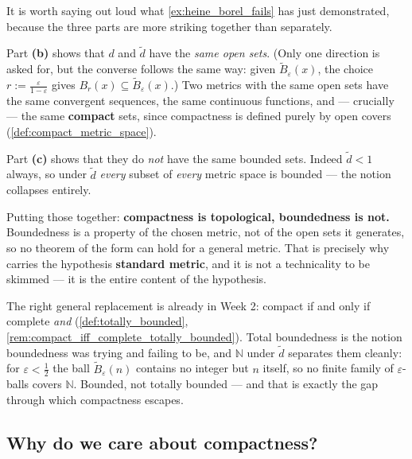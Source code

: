 \begin{remark}
\label{rem:boundedness_not_topological}
It is worth saying out loud what \cref{ex:heine_borel_fails} has just demonstrated, because the
three parts are more striking together than separately.

Part \textbf{(b)} shows that $d$ and $\tilde d$ have the \emph{same open sets}. (Only one
direction is asked for, but the converse follows the same way: given
$\tilde B_\varepsilon(x)$, the choice $r := \tfrac{\varepsilon}{1-\varepsilon}$ gives
$B_r(x) \subseteq \tilde B_\varepsilon(x)$.) Two metrics with the same open sets have the same
convergent sequences, the same continuous functions, and --- crucially --- the same
\textbf{compact} sets, since compactness is defined purely by open covers
(\cref{def:compact_metric_space}).

Part \textbf{(c)} shows that they do \emph{not} have the same bounded sets. Indeed
$\tilde d < 1$ always, so under $\tilde d$ \emph{every} subset of \emph{every} metric space is
bounded --- the notion collapses entirely.

Putting those together: \textbf{compactness is topological, boundedness is not.} Boundedness is
a property of the chosen metric, not of the open sets it generates, so no theorem of the form
 can hold for a general metric. That is precisely why
 carries the hypothesis \textbf{standard metric}, and it is not a
technicality to be skimmed --- it is the entire content of the hypothesis.

\begin{ainote}
The right general replacement is already in Week 2: compact if and only if complete \emph{and}
 (\cref{def:totally_bounded}, \cref{rem:compact_iff_complete_totally_bounded}).
Total boundedness is the notion boundedness was trying and failing to be, and $\mathbb{N}$ under
$\tilde d$ separates them cleanly: for $\varepsilon < \tfrac12$ the ball
$\tilde B_\varepsilon(n)$ contains no integer but $n$ itself, so no finite family of
$\varepsilon$-balls covers $\mathbb{N}$. Bounded, not totally bounded --- and that is exactly
the gap through which compactness escapes.
\end{ainote}
\end{remark}

\subsection{Why do we care about compactness?}


